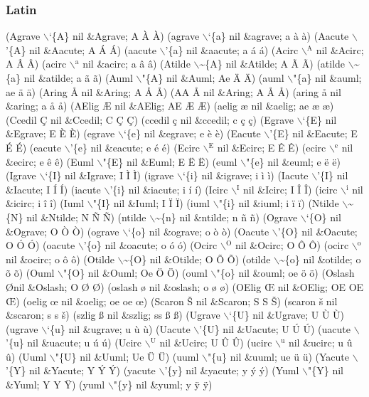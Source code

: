 \documentclass[11pt]{article}
\begin{document}
\subsubsection{Latin}
\label{sec-1-1-1}
(Agrave $\backslash$`\{A\} nil \&Agrave; A À À)
(agrave $\backslash$`\{a\} nil \&agrave; a à à)
(Aacute $\backslash$'\{A\} nil \&Aacute; A Á Á)
(aacute $\backslash$'\{a\} nil \&aacute; a á á)
(Acirc $\backslash$$^{\text{A}}$ nil \&Acirc; A Â Â)
(acirc $\backslash$$^{\text{a}}$ nil \&acirc; a â â)
(Atilde $\backslash$\textasciitilde{}\{A\} nil \&Atilde; A Ã Ã)
(atilde $\backslash$\textasciitilde{}\{a\} nil \&atilde; a ã ã)
(Auml $\backslash$"\{A\} nil \&Auml; Ae Ä Ä)
(auml $\backslash$"\{a\} nil \&auml; ae ä ä)
(Aring \AA{} nil \&Aring; A Å Å)
(AA \AA{} nil \&Aring; A Å Å)
(aring \aa{} nil \&aring; a å å)
(AElig \AE{} nil \&AElig; AE Æ Æ)
(aelig \ae{} nil \&aelig; ae æ æ)
(Ccedil \c{C} nil \&Ccedil; C Ç Ç)
(ccedil \c{c} nil \&ccedil; c ç ç)
(Egrave $\backslash$`\{E\} nil \&Egrave; E È È)
(egrave $\backslash$`\{e\} nil \&egrave; e è è)
(Eacute $\backslash$'\{E\} nil \&Eacute; E É É)
(eacute $\backslash$'\{e\} nil \&eacute; e é é)
(Ecirc $\backslash$$^{\text{E}}$ nil \&Ecirc; E Ê Ê)
(ecirc $\backslash$$^{\text{e}}$ nil \&ecirc; e ê ê)
(Euml $\backslash$"\{E\} nil \&Euml; E Ë Ë)
(euml $\backslash$"\{e\} nil \&euml; e ë ë)
(Igrave $\backslash$`\{I\} nil \&Igrave; I Ì Ì)
(igrave $\backslash$`\{i\} nil \&igrave; i ì ì)
(Iacute $\backslash$'\{I\} nil \&Iacute; I Í Í)
(iacute $\backslash$'\{i\} nil \&iacute; i í í)
(Icirc $\backslash$$^{\text{I}}$ nil \&Icirc; I Î Î)
(icirc $\backslash$$^{\text{i}}$ nil \&icirc; i î î)
(Iuml $\backslash$"\{I\} nil \&Iuml; I Ï Ï)
(iuml $\backslash$"\{i\} nil \&iuml; i ï ï)
(Ntilde $\backslash$\textasciitilde{}\{N\} nil \&Ntilde; N Ñ Ñ)
(ntilde $\backslash$\textasciitilde{}\{n\} nil \&ntilde; n ñ ñ)
(Ograve $\backslash$`\{O\} nil \&Ograve; O Ò Ò)
(ograve $\backslash$`\{o\} nil \&ograve; o ò ò)
(Oacute $\backslash$'\{O\} nil \&Oacute; O Ó Ó)
(oacute $\backslash$'\{o\} nil \&oacute; o ó ó)
(Ocirc $\backslash$$^{\text{O}}$ nil \&Ocirc; O Ô Ô)
(ocirc $\backslash$$^{\text{o}}$ nil \&ocirc; o ô ô)
(Otilde $\backslash$\textasciitilde{}\{O\} nil \&Otilde; O Õ Õ)
(otilde $\backslash$\textasciitilde{}\{o\} nil \&otilde; o õ õ)
(Ouml $\backslash$"\{O\} nil \&Ouml; Oe Ö Ö)
(ouml $\backslash$"\{o\} nil \&ouml; oe ö ö)
(Oslash \O nil \&Oslash; O Ø Ø)
(oslash \o{} nil \&oslash; o ø ø)
(OElig \OE{} nil \&OElig; OE OE Œ)
(oelig \oe{} nil \&oelig; oe oe œ)
(Scaron \v{S} nil \&Scaron; S S Š)
(scaron \v{s} nil \&scaron; s s š)
(szlig \ss{} nil \&szlig; ss ß ß)
(Ugrave $\backslash$`\{U\} nil \&Ugrave; U Ù Ù)
(ugrave $\backslash$`\{u\} nil \&ugrave; u ù ù)
(Uacute $\backslash$'\{U\} nil \&Uacute; U Ú Ú)
(uacute $\backslash$'\{u\} nil \&uacute; u ú ú)
(Ucirc $\backslash$$^{\text{U}}$ nil \&Ucirc; U Û Û)
(ucirc $\backslash$$^{\text{u}}$ nil \&ucirc; u û û)
(Uuml $\backslash$"\{U\} nil \&Uuml; Ue Ü Ü)
(uuml $\backslash$"\{u\} nil \&uuml; ue ü ü)
(Yacute $\backslash$'\{Y\} nil \&Yacute; Y Ý Ý)
(yacute $\backslash$'\{y\} nil \&yacute; y ý ý)
(Yuml $\backslash$"\{Y\} nil \&Yuml; Y Y Ÿ)
(yuml $\backslash$"\{y\} nil \&yuml; y ÿ ÿ)
\end{document}
